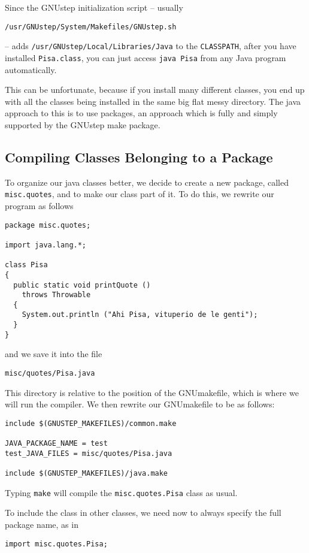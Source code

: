 Since the GNUstep initialization script -- usually 
\begin{verbatim}
/usr/GNUstep/System/Makefiles/GNUstep.sh
\end{verbatim}
-- adds \texttt{/usr/GNUstep/Local/Libraries/Java} to the
\texttt{CLASSPATH}, after you have installed \texttt{Pisa.class}, you
can just access \texttt{java Pisa} from any Java program automatically.

This can be unfortunate, because if you install many different
classes, you end up with all the classes being installed in the same
big flat messy directory.  The java approach to this is to use
packages, an approach which is fully and simply supported by the
GNUstep make package.

\subsection{Compiling Classes Belonging to a Package}

To organize our java classes better, we decide to create a new
package, called \texttt{misc.quotes}, and to make our class part of
it.  To do this, we rewrite our program as follows
\begin{verbatim}
package misc.quotes;

import java.lang.*;

class Pisa
{ 
  public static void printQuote ()
    throws Throwable
  {
    System.out.println ("Ahi Pisa, vituperio de le genti");
  }
}
\end{verbatim}
and we save it into the file 
\begin{verbatim}
misc/quotes/Pisa.java
\end{verbatim}
This directory is relative to the position of the GNUmakefile, which
is where we will run the compiler.  We then rewrite our GNUmakefile to
be as follows:
\begin{verbatim}
include $(GNUSTEP_MAKEFILES)/common.make

JAVA_PACKAGE_NAME = test
test_JAVA_FILES = misc/quotes/Pisa.java

include $(GNUSTEP_MAKEFILES)/java.make
\end{verbatim}
Typing \texttt{make} will compile the \texttt{misc.quotes.Pisa} class
as usual.

To include the class in other classes, we need now to always specify
the full package name, as in 
\begin{verbatim}
import misc.quotes.Pisa;
\end{verbatim}

